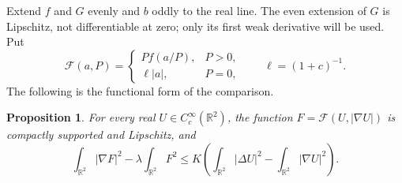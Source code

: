 \documentclass[11pt]{article}
\newtheorem{proposition}[theorem]{Proposition}
\theoremstyle{remark}
\begin{document}
Extend $f$ and $G$ evenly and $b$ oddly to the real line. The even
extension of $G$ is Lipschitz, not differentiable at zero; only its
first weak derivative will be used. Put
\[
 \mathcal F(a,P)=
 \begin{cases}P f(a/P),&P>0,\\ \ell|a|,&P=0,\end{cases}
 \qquad \ell=(1+c)^{-1}.
\]
The following is the functional form of the comparison.
\begin{proposition}\label{prop:functional}
For every real $U\in C_c^\infty(\mathbb R^2)$, the function
$F=\mathcal F(U,|\nabla U|)$ is compactly supported and Lipschitz, and
\begin{equation}\label{functional}
 \int_{\mathbb R^2}|\nabla F|^2-\lambda\int_{\mathbb R^2}F^2
 \le K\left(\int_{\mathbb R^2}|\Delta U|^2
                     -\int_{\mathbb R^2}|\nabla U|^2\right).
\end{equation}
\end{proposition}
\end{document}
